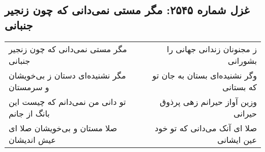 \begin{center}
\section*{غزل شماره ۲۵۴۵: مگر مستی نمی‌دانی که چون زنجیر جنبانی}
\label{sec:2545}
\begin{longtable}{l p{0.5cm} r}
مگر مستی نمی‌دانی که چون زنجیر جنبانی
&&
ز مجنونان زندانی جهانی را بشورانی
\\
مگر نشنیده‌ای دستان ز بی‌خویشان و سرمستان
&&
وگر نشنیده‌ای بستان به جان تو که بستانی
\\
تو دانی من نمی‌دانم که چیست این بانگ از جانم
&&
وزین آواز حیرانم زهی پرذوق حیرانی
\\
صلا مستان و بی‌خویشان صلا ای عیش اندیشان
&&
صلا ای آنک می‌دانی که تو خود عین ایشانی
\\
\end{longtable}
\end{center}
